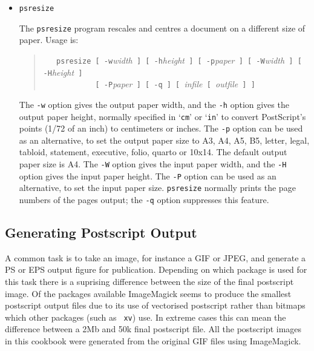 \documentclass[twoside,11pt]{article}
\newcommand{\htmlref}[2]{#1}
\newcommand{\xlabel}[1]{}
\begin{document}
\begin{itemize}
{\tt pstops} normally prints the page numbers of the pages
re-arranged; the {\tt -q} option suppresses this feature.

\item {\tt psresize}

The {\tt psresize} program rescales and centres a document on a
different size of paper. Usage is:

\begin{quote}
\verb+   psresize [ -w+{\em width}\verb+ ] [ -h+{\em height}\verb+ ] [ -p+{\em paper}\verb+ ] [ -W+{\em width}\verb+ ] [ -H+{\em height}\verb+ ]+\\
\verb+            [ -P+{\em paper}\verb+ ] [ -q ] [ +{\em infile}\verb+ [ +{\em outfile}\verb+ ] ]+
\end{quote}

The {\tt -w} option gives the output paper width, and the {\tt -h}
option gives the output paper height, normally specified in `{\tt cm}'
or `{\tt in}' to convert PostScript's points (1/72 of an inch) to
centimeters or inches. The {\tt -p} option can be used as an
alternative, to set the output paper size to A3, A4, A5, B5, letter,
legal, tabloid, statement, executive, folio, quarto or 10x14. The
default output paper size is A4. The {\tt -W} option gives the input
paper width, and the {\tt -H} option gives the input paper height. The
{\tt -P} option can be used as an alternative, to set the input paper
size. {\tt psresize} normally prints the page numbers of the pages
output; the {\tt-q} option suppresses this feature.

\end{itemize}

\subsection{\xlabel{sc15_ps_generation}Generating Postscript Output\label{sc15_ps_generation}}

A common task is to take an image, for instance a GIF or JPEG, and
generate a PS or EPS output figure for publication. Depending on which
package is used for this task there is a suprising difference between
the size of the final postscript image. Of the packages available
\htmlref{ImageMagick}{sc15_magick} seems to produce the smallest
postscript output files due to its use of vectorised postscript rather
than bitmaps which other packages (such as \htmlref{{\tt
xv}}{sc15_xv}) use. In extreme cases this can mean the difference
between a 2Mb and 50k final postscript file. All the postscript images
in this cookbook were generated from the original GIF files using
ImageMagick.
\end{document}

